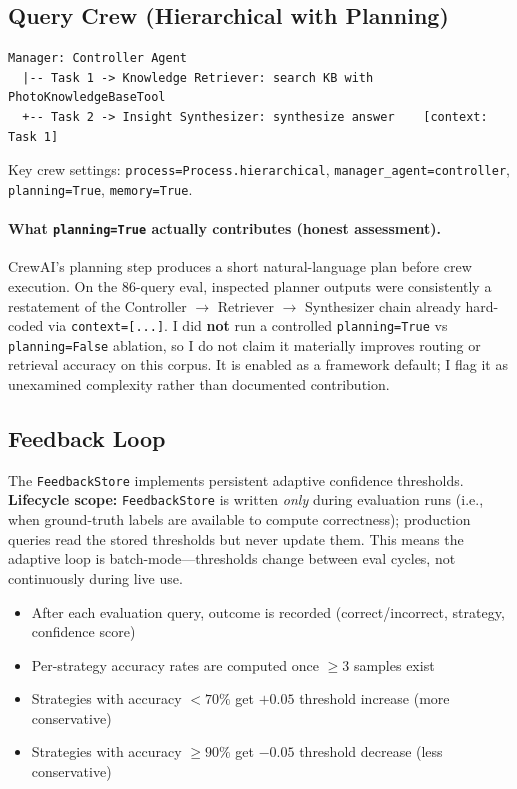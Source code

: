 \documentclass[11pt,letterpaper]{article}
\begin{document}
\subsection{Query Crew (Hierarchical with Planning)}

\begin{lstlisting}[language={},caption={Query pipeline with hierarchical delegation.}]
Manager: Controller Agent
  |-- Task 1 -> Knowledge Retriever: search KB with PhotoKnowledgeBaseTool
  +-- Task 2 -> Insight Synthesizer: synthesize answer    [context: Task 1]
\end{lstlisting}

Key crew settings: \texttt{process=Process.hierarchical}, \texttt{manager\_agent=controller}, \texttt{planning=True}, \texttt{memory=True}.

\paragraph{What \texttt{planning=True} actually contributes (honest assessment).} CrewAI's planning step produces a short natural-language plan before crew execution. On the 86-query eval, inspected planner outputs were consistently a restatement of the Controller $\to$ Retriever $\to$ Synthesizer chain already hard-coded via \texttt{context=[...]}. I did \textbf{not} run a controlled \texttt{planning=True} vs \texttt{planning=False} ablation, so I do not claim it materially improves routing or retrieval accuracy on this corpus. It is enabled as a framework default; I flag it as unexamined complexity rather than documented contribution.

\subsection{Feedback Loop}

The \texttt{FeedbackStore} implements persistent adaptive confidence thresholds.
\textbf{Lifecycle scope:} \texttt{FeedbackStore} is written \textit{only} during evaluation runs (i.e., when ground-truth labels are available to compute correctness); production queries read the stored thresholds but never update them. This means the adaptive loop is batch-mode---thresholds change between eval cycles, not continuously during live use.

\begin{itemize}[nosep]
  \item After each evaluation query, outcome is recorded (correct/incorrect, strategy, confidence score)
  \item Per-strategy accuracy rates are computed once $\geq 3$ samples exist
  \item Strategies with accuracy $< 70\%$ get $+0.05$ threshold increase (more conservative)
  \item Strategies with accuracy $\geq 90\%$ get $-0.05$ threshold decrease (less conservative)
\end{itemize}
\end{document}
